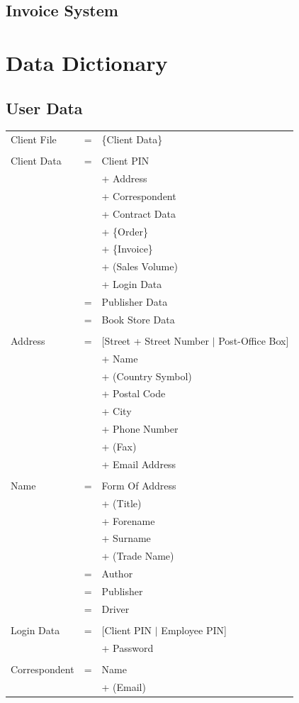\documentclass[11pt,a4paper,oneside,svgnames]{report}
\begin{document}
\section{Invoice System}


\chapter{Data Dictionary}

\section{User Data}

\begin{longtable}{p{3.5cm}p{0.5cm}p{8.5cm}}
Client File & = & \{Client Data\} \\
\\
Client Data & = & Client PIN\\
&  & + Address\\
&  & + Correspondent\\
&  & + Contract Data\\
&  & + \{Order\}\\
&  & + \{Invoice\}\\
&  & + (Sales Volume)\\
&  & + Login Data \\
& = & Publisher Data\\
& = & Book Store Data\\
\\
Address & = & [Street + Street Number $|$ Post-Office Box]\\
&  & + Name\\
&  & +  (Country Symbol)\\
&  & +  Postal Code\\
&  & + City\\
&  & + Phone Number\\
&  & + (Fax)\\
&  & + Email Address\\
\\
Name & = & Form Of Address\\
&  & + (Title)\\
&  & + Forename\\
&  & + Surname\\
&  & + (Trade Name)\\
& = & Author\\
& = & Publisher\\
& = & Driver\\
\\
Login Data & = & [Client PIN $|$ Employee PIN]\\
&  & + Password \\
\\
Correspondent & = & Name\\
&  & + (Email)\\
\end{longtable}
\end{document}
